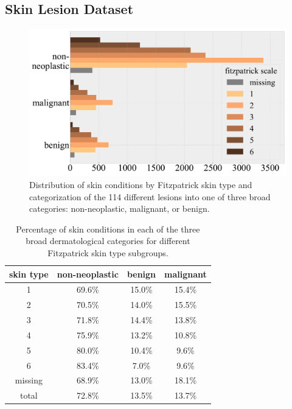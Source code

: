 \documentclass[letterpaper]{article} %
\begin{document}
    \subsection{Skin Lesion Dataset}
        \begin{figure}[t]
        \centering
        \includegraphics[width=0.99\columnwidth]{LaTeX/fitz-subgroup-class-dist.pdf}
        \caption{Distribution of skin conditions by Fitzpatrick skin type and categorization of the 114 different lesions into one of three broad categories: non-neoplastic, malignant, or benign.}
        \label{fig:fitz-dist}
        \end{figure}

        \begin{table}[t]
        \small
        \centering
        \begin{tabular}{cccc}
        \toprule
        \textbf{skin type} & \bf{non-neoplastic} & \bf{benign} & \bf{malignant} \\
        \midrule
        1 & 69.6\% & 15.0\% & 15.4\% \\
        2 & 70.5\% & 14.0\% & 15.5\% \\
        3 & 71.8\% & 14.4\% & 13.8\% \\
        4 & 75.9\% & 13.2\% & 10.8\% \\
        5 & 80.0\% & 10.4\% & 9.6\% \\
        6 & 83.4\% & 7.0\% & 9.6\% \\
        missing & 68.9\% & 13.0\% & 18.1\% \\
        \midrule
        total & 72.8\% & 13.5\% & 13.7\% \\
        \bottomrule
        \end{tabular}
        \caption{Percentage of skin conditions in each of the three broad dermatological categories for different Fitzpatrick skin type subgroups.}
        \label{tab:disease-prevalence}
        \end{table}
\end{document}
